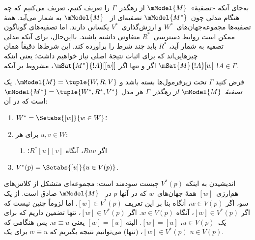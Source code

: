 \documentclass[../../../include/open-logic-section]{subfiles}
\begin{document}


به‌جای آنکه «تصفیهٔ»~$\mModel{M}$ از رهگذر~$\Gamma$ را تعریف کنیم،
تعریف می‌کنیم که چه هنگام مدلی چون~$\mModel{M^*}$ تصفیه‌ای از
~$\mModel{M}$ به شمار می‌آید. همهٔ تصفیه‌ها مجموعه‌جهان‌های~$W^*$ و
ارزش‌گذاری~$V^*$ یکسانی دارند. اما تصفیه‌های گوناگون ممکن است روابط
دسترسی~$R^*$ متفاوتی داشته باشند. بااین‌حال، برای آنکه مدلی تصفیه به
شمار آید، $R^*$ باید چند شرط را برآورده کند. این شرط‌ها دقیقاً همان
چیزهایی‌اند که برای اثبات نتیجهٔ اصلی نیاز خواهیم داشت؛ یعنی اینکه
$\mSat{M}{!A}[w]$ اگر و تنها اگر $\mSat{M^*}{!A}[{[w]}]$، مشروط بر
آنکه $!A \in \Gamma$.

\begin{defn}
  فرض کنید $\Gamma$ تحت زیرفرمول‌ها بسته باشد و $\mModel{M} = \tuple{W,
    R, V}$. یک \emph{تصفیهٔ~$\mModel{M}$ از رهگذر~$\Gamma$} هر مدل
  $\mModel{M^*} = \tuple{W^*,R^*,V^*}$ است که در آن:
  \begin{enumerate}
  \item $W^* = \Setabs{[w]}{w \in W}$؛
  \item {}%
    برای هر $u,v \in W$:
    \begin{enumerate}
    \item {}%
      اگر $Ruv$، آنگاه $R^*[u][v]$؛
    \end{enumerate}
  \item $V^*(p) = \Setabs{[u]}{u \in V(p)}$.
  \end{enumerate}
\end{defn}

اندیشیدن به اینکه $V^*(p)$ چیست سودمند است: مجموعه‌ای متشکل از
کلاس‌های هم‌ارزی~$[w]$ همهٔ جهان‌های~$w$ که در آنها $p$ در
~$\mModel{M}$ صادق است. از یک سو، اگر $w \in V(p)$، آنگاه بنا بر این
تعریف $[w] \in V^*(p)$. اما لزوماً چنین نیست که اگر $[w] \in
V^*(p)$، آنگاه $w \in V(p)$. اگر $[w] \in V^*(p)$، تنها تضمین داریم
که برای \emph{یک}~$u \in V(p)$، $[w] = [u]$. البته $[w] = [u]$ یعنی
$w \equiv u$. پس هنگامی که $[w] \in V^*(p)$، (تنها) می‌توانیم نتیجه
بگیریم که $w \equiv u$ برای یک $u \in V(p)$.
\end{document}
